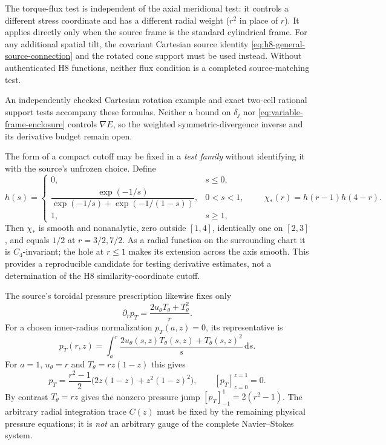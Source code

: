 \documentclass[11pt,a4paper]{article}
\theoremstyle{plain}
\theoremstyle{definition}
\newcommand{\dd}{\,\mathrm{d}}
\begin{document}
The torque-flux test is independent of the axial meridional
test: it controls a different stress coordinate and has a
different radial weight ($r^2$ in place of $r$).
It applies directly only when the source frame is the standard
cylindrical frame. For any additional spatial tilt, the
covariant Cartesian source identity
\eqref{eq:h8-general-source-connection} and the rotated cone
support must be used instead. Without authenticated H8 functions,
neither flux condition is a completed source-matching test.

An independently checked Cartesian rotation example and exact
two-cell rational support tests accompany these formulas.
Neither a bound on $\delta_j$ nor
\eqref{eq:variable-frame-enclosure} controls $\nabla E$,
so the weighted symmetric-divergence inverse and its
derivative budget remain open.

The form of a compact cutoff may be fixed in a \emph{test family}
without identifying it with the source's unfrozen choice. Define
\[
 h(s)=\begin{cases}
   0,&s\le0,\\
   \dfrac{\exp(-1/s)}{\exp(-1/s)+\exp(-1/(1-s))},&0<s<1,\\
   1,&s\ge1,
 \end{cases}
 \qquad \chi_*(r)=h(r-1)h(4-r).
\]
Then $\chi_*$ is smooth and nonanalytic, zero outside $[1,4]$,
identically one on $[2,3]$, and equals $1/2$ at $r=3/2,7/2$.
As a radial function on the surrounding chart it is $C_4$-invariant;
the hole at $r\le1$ makes its extension across the axis smooth.
This provides a reproducible candidate for testing derivative
estimates, not a determination of the H8 similarity-coordinate cutoff.

The source's toroidal pressure prescription likewise fixes only
\begin{equation}\label{eq:c4-pressure}
 \partial_r p_T=\frac{2u_\theta T_\theta+T_\theta^2}{r}.
\end{equation}
For a chosen inner-radius normalization $p_T(a,z)=0$, its
representative is
\[
 p_T(r,z)=\int_a^r\frac{2u_\theta(s,z)T_\theta(s,z)
                         +T_\theta(s,z)^2}{s}\dd s.
\]
For $a=1$, $u_\theta=r$ and $T_\theta=rz(1-z)$ this gives
\[
 p_T=\frac{r^2-1}{2}\bigl(2z(1-z)+z^2(1-z)^2\bigr),
 \qquad [p_T]_{z=0}^{z=1}=0.
\]
By contrast $T_\theta=rz$ gives the nonzero pressure jump
$[p_T]_{-1}^{1}=2(r^2-1)$. The arbitrary radial integration trace
$C(z)$ must be fixed by the remaining physical pressure equations;
it is \emph{not} an arbitrary gauge of the complete Navier--Stokes
system.
\end{document}
